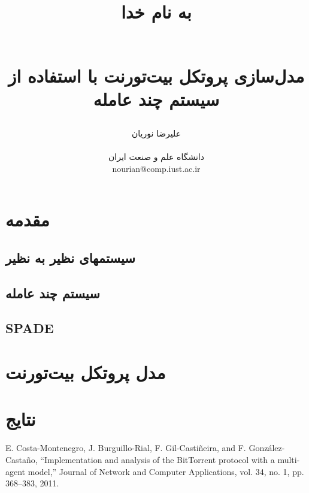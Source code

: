 \documentclass{article}
\title{ 
\begin{normalsize} به نام خدا \end{normalsize}
\\[2cm]
 مدل‌سازی پروتکل بیت‌تورنت با استفاده از سیستم چند عامله
}
\author{علیرضا نوریان
\\
\\ \small دانشگاه علم و صنعت ایران
\\ \small nourian@comp.iust.ac.ir
}
\begin{document}
\maketitle

\section{مقدمه}

\subsection{سیستمهای نظیر به نظیر}

\subsection{سیستم چند عامله}

\subsection{SPADE}

\section{مدل پروتکل بیت‌تورنت}

\section{نتایج}


\renewcommand*{\refname}{\section{منابع}}
\begin{thebibliography}{9}
\begin{latin}

E. Costa-Montenegro, J. Burguillo-Rial, F. Gil-Castiñeira, and F. González-Castaño, “Implementation and analysis of the BitTorrent protocol with a multi-agent model,” Journal of Network and Computer Applications, vol. 34, no. 1, pp. 368–383, 2011.


\end{latin}
\end{thebibliography}
\end{document}
